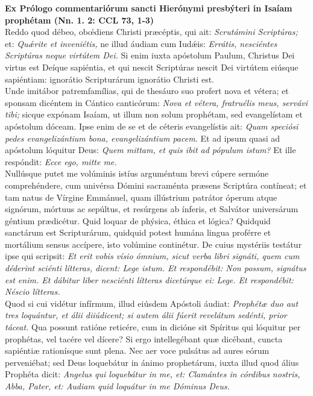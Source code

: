 \documentclass[options]{article}
\begin{document}
	\textbf{Ex Prólogo commentariórum sancti Hierónymi presbýteri in Isaíam prophétam (Nn. 1. 2: CCL 73, 1-3)}\\
	
	Reddo quod débeo, ob\'{œ}diens Christi præcéptis, qui ait: 
	\textit{Scrutámini Scriptúras;}
	et: 
	\textit{Qu\'{æ}rite et inveniétis,}
	ne illud áudiam cum Iud\'{æ}is: 
	\textit{Errátis, nesciéntes Scriptúras neque virtútem Dei.}
	Si enim iuxta apóstolum Paulum, Christus Dei virtus est Deíque sapiéntia, et qui nescit Scriptúras nescit Dei virtútem eiúsque sapiéntiam: ignorátio Scripturárum ignorátio Christi est.\\
	Unde imitábor patremfamílias, qui de thesáuro suo profert nova et vétera; et sponsam dicéntem in Cántico canticórum:
	\textit{Nova et vétera, fratruélis meus, servávi tibi;}
	sicque expónam Isaíam, ut illum non solum prophétam, sed evangelístam et apóstolum dóceam. Ipse enim de se et de céteris evangelístis ait: 
	\textit{Quam speciósi pedes evangelizántium bona, evangelizántium pacem.}
	Et ad ipsum quasi ad apóstolum lóquitur Deus: 
	\textit{Quem mittam, et quis ibit ad pópulum istum?}
	Et ille respóndit: 
	\textit{Ecce ego, mitte me.}\\
	Nullúsque putet me volúminis istíus arguméntum brevi cúpere sermóne comprehéndere, cum univérsa Dómini sacraménta præsens Scriptúra contíneat; et tam natus de Vírgine Emmánuel, quam illústrium patrátor óperum atque signórum, mórtuus ac sepúltus, et resúrgens ab ínferis, et Salvátor universárum géntium prædicétur. Quid loquar de phýsica, éthica et lógica? Quidquid sanctárum est Scripturárum, quidquid potest humána lingua proférre et mortálium sensus accípere, isto volúmine continétur. De cuius mystériis testátur ipse qui scripsit:
	\textit{Et erit vobis vísio ómnium, sicut verba libri signáti, quem cum déderint sciénti lítteras, dicent: Lege istum. Et respondébit: Non possum, signátus est enim. Et dábitur liber nesciénti lítteras dicetúrque ei: Lege. Et respondébit: Néscio lítteras.}\\
	 Quod si cui vidétur infírmum, illud eiúsdem Apóstoli áudiat: 
	 \textit{Prophétæ duo aut tres loquántur, et álii diiúdicent; si autem álii fúerit revelátum sedénti, prior táceat.}
	 Qua possunt ratióne reticére, cum in dicióne sit Spíritus qui lóquitur per prophétas, vel tacére vel dícere? Si ergo intellegébant quæ dicébant, cuncta sapiéntiæ rationísque sunt plena. Nec aer voce pulsátus ad aures eórum perveniébat; sed Deus loquebátur in ánimo prophetárum, iuxta illud quod álius Prophéta dicit: 
	 \textit{Angelus qui loquebátur in me, et: Clamántes in córdibus nostris, Abba, Pater, et: Audiam quid loquátur in me Dóminus Deus.}
	
	 
\end{document}
